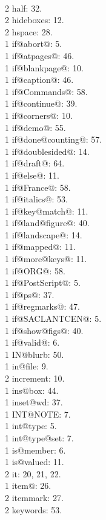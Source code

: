 \\2 half: 32.
\\2 hideboxes: 12.
\\2 hspace: 28.
\\1 if@abort@: 5.
\\1 if@atpages@: 46.
\\1 if@blankpage@: 10.
\\1 if@caption@: 46.
\\1 if@Commands@: 58.
\\1 if@continue@: 39.
\\1 if@corners@: 10.
\\1 if@demo@: 55.
\\1 if@done@counting@: 57.
\\1 if@doublesided@: 14.
\\1 if@draft@: 64.
\\1 if@else@: 11.
\\1 if@France@: 58.
\\1 if@italics@: 53.
\\1 if@key@match@: 11.
\\1 if@land@figure@: 40.
\\1 if@landscape@: 14.
\\1 if@mapped@: 11.
\\1 if@more@keys@: 11.
\\1 if@ORG@: 58.
\\1 if@PostScript@: 5.
\\1 if@ps@: 37.
\\1 if@regmarks@: 47.
\\1 if@SACLANTCEN@: 5.
\\1 if@show@figs@: 40.
\\1 if@valid@: 6.
\\1 IN@blurb: 50.
\\1 in@file: 9.
\\2 increment: 10.
\\1 ins@box: 44.
\\1 inset@wd: 37.
\\1 INT@NOTE: 7.
\\1 int@type: 5.
\\1 int@type@set: 7.
\\1 is@member: 6.
\\1 is@valued: 11.
\\2 it: 20, 21, 22.
\\1 item@: 26.
\\2 itemmark: 27.
\\2 keywords: 53.
